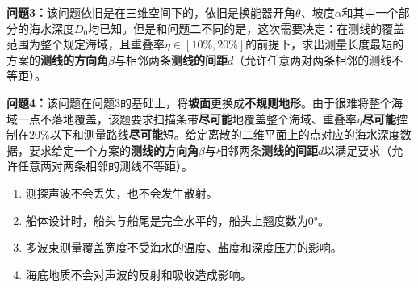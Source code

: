 \textbf{问题3：}该问题依旧是在三维空间下的，依旧是换能器开角$\theta$、坡度$\alpha$和其中一个部分的海水深度$D_0$均已知。但是和问题二不同的是，这次需要决定：在测线的覆盖范围为整个规定海域，且重叠率$\eta \in [10\%, 20\%]$的前提下，求出测量长度最短的方案的\textbf{测线的方向角}$\beta$与相邻两条\textbf{测线的间距}$d$（允许任意两对两条相邻的测线不等距）。

\textbf{问题4：}该问题在问题3的基础上，将\textbf{坡面}更换成\textbf{不规则地形}。由于很难将整个海域一点不落地覆盖，该题要求扫描条带\textbf{尽可能}地覆盖整个海域、重叠率$\eta$\textbf{尽可能}控制在$20\%$以下和测量路线\textbf{尽可能}短。给定离散的二维平面上的点对应的海水深度数据，要求给定一个方案的\textbf{测线的方向角}$\beta$与相邻两条\textbf{测线的间距}$d$以满足要求（允许任意两对两条相邻的测线不等距）。







\begin{enumerate}
    \item 测探声波不会丢失，也不会发生散射。
    \item 船体设计时，船头与船尾是完全水平的，船头上翘度数为0°。
    \item 多波束测量覆盖宽度不受海水的温度、盐度和深度压力的影响。
    \item 海底地质不会对声波的反射和吸收造成影响。
\end{enumerate}




